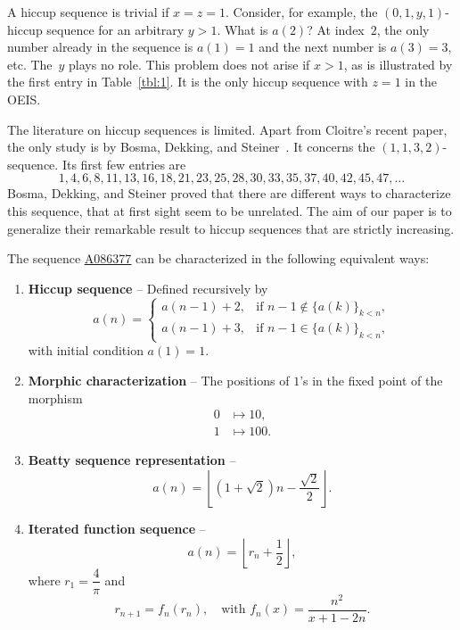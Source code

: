 \documentclass[12pt,reqno]{article}
\newcommand{\seqnum}[1]{\href{https://oeis.org/#1}{\rm \underline{#1}}}
\begin{document}
A hiccup sequence is trivial if $x=z=1$. 
Consider, for example, the $(0,1,y,1)$-hiccup sequence for an arbitrary $y>1$. 
What is $a(2)$? At index~$2$, the only number already in the 
sequence is $a(1)=1$ and the next number is $a(3)=3$, etc. The~$y$
plays no role.
This problem does not arise if $x>1$,
as is illustrated by the first entry in Table~\ref{tbl:1}. It
is the only hiccup sequence with $z=1$ in the OEIS.

\medbreak

The literature on hiccup sequences is limited. Apart from Cloitre's recent
paper, the only study is
 by Bosma, Dekking, and Steiner~\cite{bosma2018}. It concerns
the $(1,1,3,2)$-sequence. Its
first few entries are
\[
1, 4, 6, 8, 11, 13, 16, 18, 21, 23, 25, 28, 30, 33, 35, 37, 40, 42, 45, 47,\ldots
\]
Bosma, Dekking, and Steiner proved that there are different ways to characterize this sequence,
that at first sight seem to be unrelated.
The aim of our paper is to generalize their remarkable result to hiccup sequences
that are strictly increasing.


\begin{theorem}\label{thm:1}
The sequence {\seqnum{A086377}} can be characterized in the following equivalent ways:
\begin{enumerate}[label=\textnormal{(\arabic*)}, leftmargin=1.2cm]
    \item \textbf{\textup{Hiccup sequence}} -- Defined recursively by
    \[
    a(n) = 
    \begin{cases}
        a(n-1) + 2, & \text{if } n-1 \notin \{a(k)\}_{k < n}, \\[4pt]
        a(n-1) + 3, & \text{if } n-1 \in \{a(k)\}_{k < n},
    \end{cases}
    \]
    with initial condition $a(1) = 1$.

    \item \textbf{\textup{Morphic characterization}} -- The positions of $1$'s in the fixed point of the morphism
    \[
    \begin{aligned}
    0 &\mapsto 10, \\
    1 &\mapsto 100.
    \end{aligned}
    \]

    \item \textbf{\textup{Beatty sequence representation}} --
    \[
    a(n) = \left\lfloor (1 + \sqrt{2})n - \frac{\sqrt{2}}{2} \right\rfloor.
    \]

    \item \textbf{\textup{Iterated function sequence}} --
    \[
    a(n) = \left\lfloor r_n + \frac{1}{2} \right\rfloor,
    \]
    where $r_1 = \dfrac{4}{\pi}$ and
    \[
    r_{n+1} = f_n(r_n), \quad \text{with } f_n(x) = \frac{n^2}{x + 1 - 2n}.
    \]
\end{enumerate}
\end{theorem}
\end{document}
